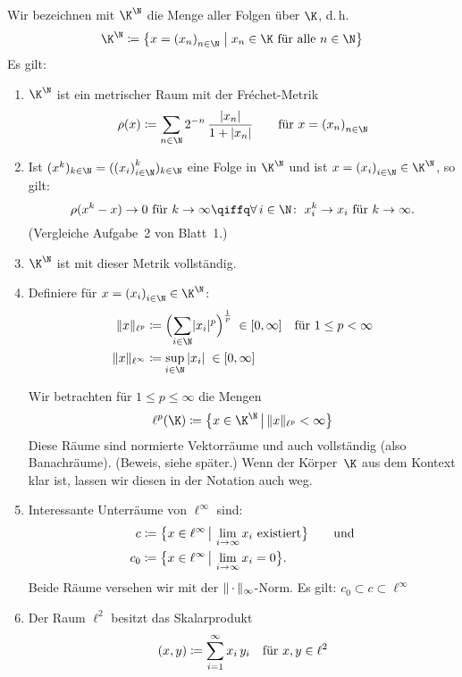 \begin{thEmpty}[Folgenräume] \label{vl03:2.12:Folgenraeume}
    Wir bezeichnen mit $\K^\N$ die Menge aller Folgen über $\K$, d.\,h.
    \[ \K^\N \defeq \left\{ x=\nSeq x \Mid x_n\in\K \text{ für alle $n\in\N$}
        \right\} 
    \]
    Es gilt:
    \begin{enumerate}[1)]
        \item 
            $\K^\N$ ist ein metrischer Raum mit der Fr\'echet-Metrik
            \[ \rho(x) \defeq \sum_{n\in\N} 2^{-n}\,
                \frac{\abs{x_n}}{1+\abs{x_n}}
                \qquad\text{für $x=\nSeq x$}
            \]
        \item
            Ist $(x^k)_{k\in\N} = (\iSeq{x}^k)_{k\in\N}$ eine Folge in $\K^\N$ und ist
            $x=\iSeq x \in \K^\N$, so gilt:
            \[ \rho(x^k-x) \to 0 \text{ für } k\to\infty
                \qiffq \forall\,i\in\N\colon\; x_i^k \to x_i
                \text{ für } k\to\infty
            . \]
            (Vergleiche Aufgabe~2 von Blatt~1.)
        \item
            $\K^\N$ ist mit dieser Metrik vollständig.
        \item
            Definiere für $x=\iSeq x\in\K^\N$:
            \begin{align*} 
                \normlp{x} &\defeq \Bigl( \sum_{i\in\N} \abs{x_i}^p
                \Bigr)^{\frac{1}{p}} \;\in[0,\infty]
                \quad\text{für $1\leq p<\infty$}
                \\
                \normlinf{x} &\defeq \sup_{i\in\N} \, \abs{x_i}
                \;\in[0,\infty]
            \end{align*}
            
            Wir betrachten für $1\leq p\leq \infty$ die Mengen
            \[ \ell^p(\K) \defeq \bigl\{ x\in\K^\N \cMid\big
                    \normlp{x} < \infty \bigr\}
            \]
            Diese Räume sind normierte Vektorräume und auch vollständig (also
            Banachräume). (Beweis, siehe später.) %
            Wenn der Körper~$\K$ aus dem Kontext klar ist, lassen wir diesen in
            der Notation auch weg.
        \item \label{vl03:2.12:Folgenraeume:Unterraeume}
            Interessante Unterräume von $\ell^\infty$ sind:
            \begin{align*}
                c &\coloneqq \bigl\{ x\in\ell^\infty \,\big\vert\, \lim_{i\to\infty} x_i
                \text{ existiert} \bigr\} \qquad\text{und}
                \\
                c_0 &\coloneqq \bigl\{ x\in\ell^\infty \,\big\vert\, \lim_{i\to\infty} x_i =
                0\bigr\}
            . \end{align*}
            Beide Räume versehen wir mit der $\lVert\,\cdot\,\rVert_\infty$-Norm. Es gilt:%
            \; $\displaystyle c_0 \subset c \subset \ell^\infty$
        \item
            Der Raum $\ell^2$ besitzt das Skalarprodukt
            \[ (x,y) \coloneqq \sum_{i=1}^\infty x_i\,y_i
                \quad\text{für } x,y\in\ell^2
            \]
    \end{enumerate}
\end{thEmpty}

